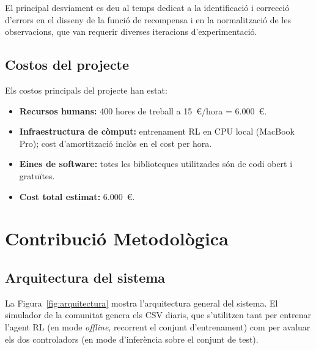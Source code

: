 \documentclass[a4paper,12pt,twoside]{ThesisStyle}
\begin{document}
El principal desviament es deu al temps dedicat a la identificació i correcció d'errors en el disseny de la funció de recompensa i en la normalització de les observacions, que van requerir diverses iteracions d'experimentació.

\section{Costos del projecte}

Els costos principals del projecte han estat:
\begin{itemize}
    \item \textbf{Recursos humans:} 400 hores de treball a 15~€/hora = 6.000~€.
    \item \textbf{Infraestructura de còmput:} entrenament RL en CPU local (MacBook Pro); cost d'amortització inclòs en el cost per hora.
    \item \textbf{Eines de software:} totes les biblioteques utilitzades són de codi obert i gratuïtes.
    \item \textbf{Cost total estimat:} 6.000~€.
\end{itemize}


\chapter{Contribució Metodològica}
\label{cap:contrib}

\section{Arquitectura del sistema}

La Figura~\ref{fig:arquitectura} mostra l'arquitectura general del sistema. El simulador de la comunitat genera els CSV diaris, que s'utilitzen tant per entrenar l'agent RL (en mode \textit{offline}, recorrent el conjunt d'entrenament) com per avaluar els dos controladors (en mode d'inferència sobre el conjunt de test).
\end{document}
